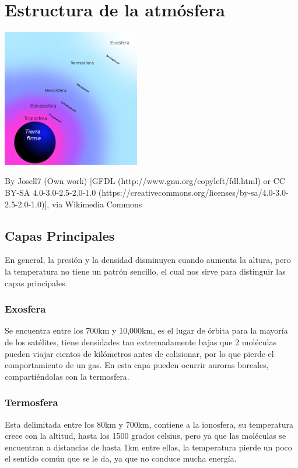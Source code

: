 \documentclass[11pt]{article}
\begin{document}
\section{Estructura de la atmósfera}

\begin{center}
\includegraphics[height=6cm]{terrestre.png}

By Josell7 (Own work) [GFDL (http://www.gnu.org/copyleft/fdl.html) or CC BY-SA 4.0-3.0-2.5-2.0-1.0 (https://creativecommons.org/licenses/by-sa/4.0-3.0-2.5-2.0-1.0)], via Wikimedia Commons
\end{center}
	\subsection{Capas Principales}
    	En general, la presión y la densidad disminuyen cuando aumenta la altura, pero la 		temperatura no tiene un patrón sencillo, el cual nos sirve para distinguir las
      capas principales.
    
    	\subsubsection{Exosfera}
    	Se encuentra entre los 700km y 10,000km, es el lugar de órbita para la mayoría 	 		de los satélites, tiene densidades tan extremadamente bajas que 2 moléculas 			pueden viajar cientos de kilómetros antes de colisionar, por lo que pierde			    el comportamiento de un gas. En esta capa pueden ocurrir auroras boreales,              		compartiéndolas con la termosfera.
        
    	\subsubsection{Termosfera}
        Esta delimitada entre los 80km y 700km, contiene a la ionosfera, su temperatura 		crece con la altitud, hasta los 1500 grados celsius, pero ya que las moléculas se		encuentran a distancias de hasta 1km entre ellas, la temperatura pierde un poco el 		 sentido común que se le da, ya que no conduce mucha energía.
\end{document}
